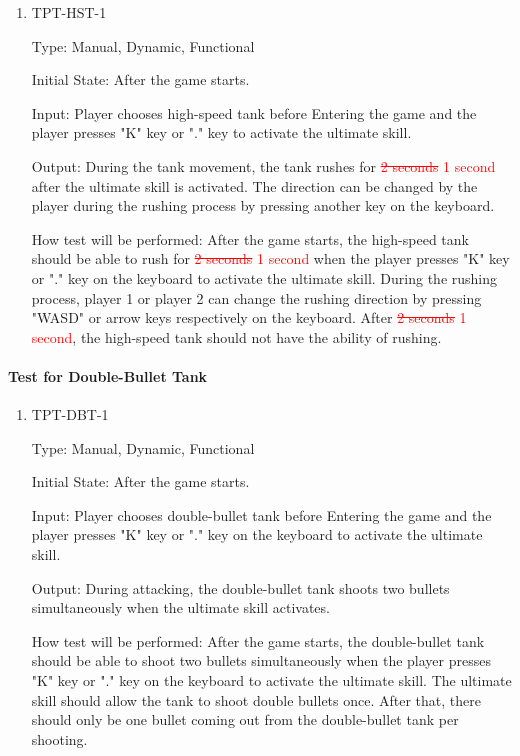 \documentclass[12pt, titlepage]{article}
\begin{document}
\begin{enumerate}

\item{TPT-HST-1\\}

Type: Manual, Dynamic, Functional
					
Initial State: After the game starts.
					
Input: Player chooses high-speed tank before Entering the game and the player presses "K" key or "." key to activate the ultimate skill.
					
Output: During the tank movement, the tank rushes for \textcolor{red}{\sout{2 seconds}} \textcolor{red}{1 second} after the ultimate skill is activated. The direction can be changed by the player during the rushing process by pressing another key on the keyboard.
					
How test will be performed: After the game starts, the high-speed tank should be able to rush for \textcolor{red}{\sout{2 seconds}} \textcolor{red}{1 second} when the player presses "K" key or "." key on the keyboard to activate the ultimate skill. During the rushing process, player 1 or player 2 can change the rushing direction by pressing "WASD" or arrow keys respectively on the keyboard. After \textcolor{red}{\sout{2 seconds}} \textcolor{red}{1 second}, the high-speed tank should not have the ability of rushing.

\end{enumerate}

\paragraph{Test for Double-Bullet Tank}

\begin{enumerate}

\item{TPT-DBT-1\\}

Type: Manual, Dynamic, Functional
					
Initial State: After the game starts.
					
Input: Player chooses double-bullet tank before Entering the game and the player presses "K" key or "." key on the keyboard to activate the ultimate skill.
					
Output: During attacking, the double-bullet tank shoots two bullets simultaneously when the ultimate skill activates. 
					
How test will be performed: After the game starts, the double-bullet tank should be able to shoot two bullets simultaneously when the player presses "K" key or "." key on the keyboard to activate the ultimate skill. The ultimate skill should allow the tank to shoot double bullets once. After that, there should only be one bullet coming out from the double-bullet tank per shooting.

\end{enumerate}
\end{document}
